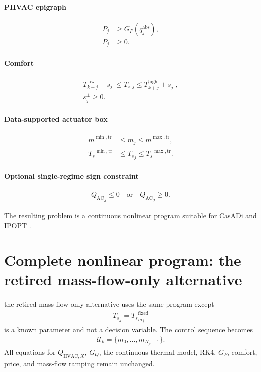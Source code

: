 \documentclass[11pt]{article}
\newcommand{\Ts}{T_s}
\newcommand{\mdot}{\dot m}
\newcommand{\QAC}{Q_{\mathrm{AC}}}
\newcommand{\QHX}{Q_{\mathrm{HVAC},X}}
\begin{document}
\paragraph{PHVAC epigraph}
\begin{align}
P_j&\ge G_P(q_j^{\mathrm{abs}}),
\\
P_j&\ge0.
\tag{6.72}
\end{align}

\paragraph{Comfort}
\begin{align}
T^{\mathrm{low}}_{k+j}-s_j^-
\le
T_{z,j}
\le
T^{\mathrm{high}}_{k+j}+s_j^+,
\\
s_j^\pm\ge0.
\tag{6.73}
\end{align}

\paragraph{Data-supported actuator box}
\begin{align}
\mdot^{\min,\mathrm{tr}}
&\le\mdot_j\le\mdot^{\max,\mathrm{tr}},
\\
{\Ts}^{\min,\mathrm{tr}}
&\le{\Ts}_j\le{\Ts}^{\max,\mathrm{tr}}.
\tag{6.74}
\end{align}

\paragraph{Optional single-regime sign constraint}
\begin{align}
{\QAC}_j\le0
\quad\text{or}\quad
{\QAC}_j\ge0.
\tag{6.75}
\end{align}

The resulting problem is a continuous nonlinear program suitable for CasADi and IPOPT
\citep{andersson2019casadi,wachter2006ipopt}.

\section{Complete nonlinear program: the retired mass-flow-only alternative}

the retired mass-flow-only alternative uses the same program except
\begin{align}
{\Ts}_j
=
{\Ts}_{m_j}^{\mathrm{fixed}}
\end{align}
is a known parameter and not a decision variable.  The control sequence becomes
\begin{align}
\mathcal U_k
=
\{\mdot_0,\ldots,\mdot_{N_p-1}\}.
\tag{6.76}
\end{align}
All equations for \(\QHX\), \(G_Q\), the continuous thermal model, RK4, \(G_P\), comfort, price,
and mass-flow ramping remain unchanged.
\end{document}
